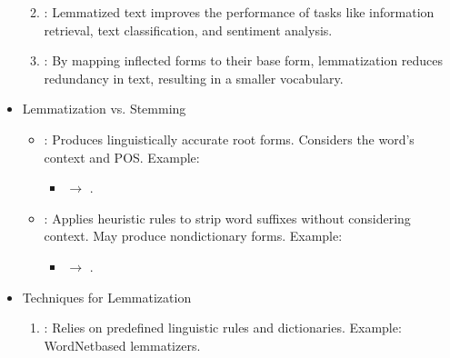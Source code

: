 \documentclass[letterpaper,11pt,english]{sphinxmanual}
\begin{document}
\begin{itemize}
\begin{enumerate}
\begin{itemize}
\end{itemize}

\item {} 
\sphinxAtStartPar
{}:
\sphinxhyphen{} Lemmatized text improves the performance of tasks like information retrieval, text classification, and sentiment analysis.

\item {} 
\sphinxAtStartPar
{}:
\sphinxhyphen{} By mapping inflected forms to their base form, lemmatization reduces redundancy in text, resulting in a smaller vocabulary.

\end{enumerate}

\item {} 
\sphinxAtStartPar
Lemmatization vs. Stemming
\begin{itemize}
\item {} 
\sphinxAtStartPar
{}:
\sphinxhyphen{} Produces linguistically accurate root forms.
\sphinxhyphen{} Considers the word’s context and POS.
\sphinxhyphen{} Example:
\begin{itemize}
\item {} 
\sphinxAtStartPar
{} \(\rightarrow\) .

\end{itemize}

\item {} 
\sphinxAtStartPar
{}:
\sphinxhyphen{} Applies heuristic rules to strip word suffixes without considering context.
\sphinxhyphen{} May produce non\sphinxhyphen{}dictionary forms.
\sphinxhyphen{} Example:
\begin{itemize}
\item {} 
\sphinxAtStartPar
{} \(\rightarrow\) .

\end{itemize}

\end{itemize}

\item {} 
\sphinxAtStartPar
Techniques for Lemmatization
\begin{enumerate}
%
\item {} 
\sphinxAtStartPar
{}:
\sphinxhyphen{} Relies on predefined linguistic rules and dictionaries.
\sphinxhyphen{} Example: WordNet\sphinxhyphen{}based lemmatizers.


\end{enumerate}
\end{itemize}
\end{document}
